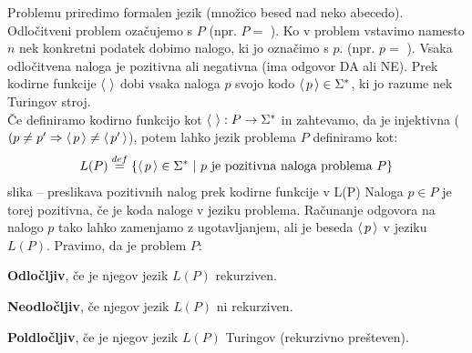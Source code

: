 \documentclass[10pt,a4paper,oneside]{book}
\begin{document}
Problemu priredimo formalen jezik (množico besed nad neko abecedo).
\br
Odločitveni problem ozačujemo s $P$ (npr. $P=$ ). Ko v problem vstavimo namesto $n$ nek konkretni podatek dobimo nalogo, ki jo označimo s $p$. (npr. $p=$ ). Vsaka odločitvena naloga je pozitivna ali negativna (ima odgovor DA ali NE).
Prek kodirne funkcije $\langle\,{}\,\rangle$ dobi vsaka naloga $p$ svojo kodo $\langle\,{p}\,\rangle\in\Sigma^*$, ki jo razume nek Turingov stroj.\\
Če definiramo kodirno funkcijo kot $\langle\,{}\,\rangle : P \rightarrow \Sigma^*$ in zahtevamo, da je injektivna ($(p \neq p' \Rightarrow \langle\,{p}\,\rangle \neq \langle\,{p'}\,\rangle$), potem lahko jezik problema $P$ definiramo kot:
\[ L(P) \overset{def}{=} \{ \langle\,{p}\,\rangle\in\Sigma^* \ | \  p \mbox{ je pozitivna naloga problema } P \} \]
\fixme slika -- preslikava pozitivnih nalog prek kodirne funkcije v L(P)%
\br
Naloga $p \in P$ je torej pozitivna, če je koda naloge v jeziku problema. Računanje odgovora na nalogo $p$ tako lahko zamenjamo z ugotavljanjem, ali je beseda $\langle\,{p}\,\rangle$ v jeziku $L(P)$.
\br
Pravimo, da je problem $P$:
\begin{items}
\item \textbf{Odločljiv}, če je njegov jezik $L(P)$ rekurziven.
\item \textbf{Neodločljiv}, če njegov jezik $L(P)$ ni rekurziven.
\item \textbf{Poldločljiv}, če je njegov jezik $L(P)$ Turingov (rekurzivno prešteven).%
\end{items}
\end{document}
